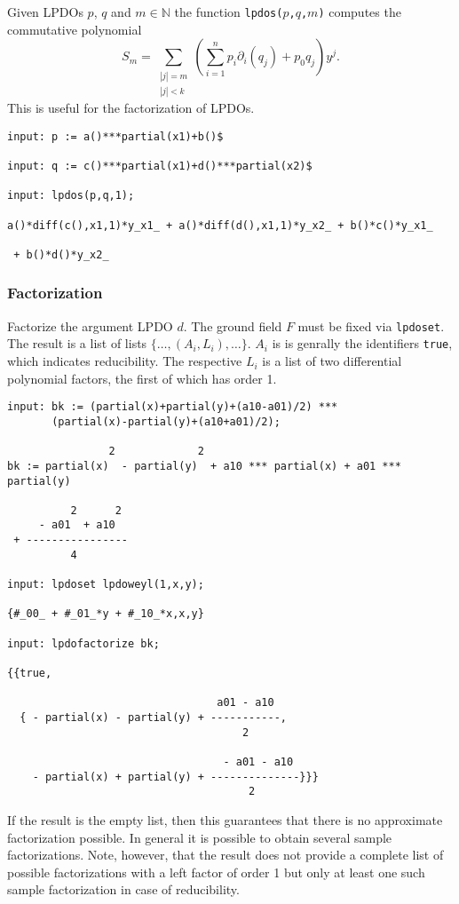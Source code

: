 Given LPDOs $p$, $q$ and $m\in\mathbb{N}$ the function
\texttt{lpdos($p$,$q$,$m$)} computes the commutative polynomial \[S_m
= \sum_{\substack{|j| = m\\ |j| < k}} \left(\sum_{i = 1}^n
p_i \partial_i(q_j) + p_0 q_j\right)y^{j}.\] This is useful for the
factorization of LPDOs. %
\begin{footnotesize}
\begin{verbatim}
input: p := a()***partial(x1)+b()$

input: q := c()***partial(x1)+d()***partial(x2)$

input: lpdos(p,q,1);

a()*diff(c(),x1,1)*y_x1_ + a()*diff(d(),x1,1)*y_x2_ + b()*c()*y_x1_

 + b()*d()*y_x2_
\end{verbatim}
\end{footnotesize}


\subsubsection{Factorization}

Factorize the argument LPDO $d$. The ground field $F$ must be fixed via
\texttt{lpdoset}. The result is a list of lists
$\{\dots,(A_i,L_i),\dots\}$. $A_i$ is is genrally the identifiers
\texttt{true}, which indicates reducibility. The respective $L_i$ is a
list of two differential polynomial factors, the first of which has
order 1.

\begin{footnotesize}
\begin{verbatim}
input: bk := (partial(x)+partial(y)+(a10-a01)/2) ***
       (partial(x)-partial(y)+(a10+a01)/2);

                2             2
bk := partial(x)  - partial(y)  + a10 *** partial(x) + a01 *** partial(y)

          2      2
     - a01  + a10
 + ----------------
          4

input: lpdoset lpdoweyl(1,x,y);

{#_00_ + #_01_*y + #_10_*x,x,y}

input: lpdofactorize bk;

{{true,

                                 a01 - a10
  { - partial(x) - partial(y) + -----------,
                                     2

                                  - a01 - a10
    - partial(x) + partial(y) + --------------}}}
                                      2
\end{verbatim}
\end{footnotesize}
If the result is the empty list, then this guarantees that there is no
approximate factorization possible. In general it is possible to obtain
several sample factorizations. Note, however, that the result does not
provide a complete list of possible factorizations with a left factor of
order 1 but only at least one such sample factorization in case of
reducibility.

